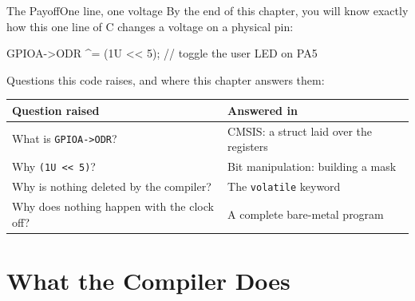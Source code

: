 \documentclass[9pt,aspectratio=169,xcolor=table]{beamer}
\newcommand{\shl}{\texttt{<{}<}}
\begin{document}
{\beamerextras
\begin{frame}[fragile]{The Payoff}{One line, one voltage}
    \leavevmode
    By the end of this chapter, you will know exactly how this one line of C changes a voltage on a physical pin:

    \vspace{2mm}
    \begin{center}
    \begin{minipage}{.9\textwidth}
\begin{cc}[basicstyle=\ttfamily\small]
GPIOA->ODR ^= (1U << 5);    // toggle the user LED on PA5
\end{cc}
    \end{minipage}
    \end{center}

    \vspace{2mm}
    {\small Questions this code raises, and where this chapter answers them:}

    \vspace{1mm}
    \begin{center}
    {\small
    \striped
    \begin{tabular}{@{}l R{.52\textwidth}@{}}
        \toprule
        \textbf{Question raised} & \textbf{Answered in} \\
        \midrule
        What is \texttt{GPIOA->ODR}? & CMSIS: a struct laid over the registers \\
        Why \texttt{(1U \shl\ 5)}? & Bit manipulation: building a mask \\
        Why is nothing deleted by the compiler? & The \texttt{volatile} keyword \\
        Why does nothing happen with the clock off? & A complete bare-metal program \\
        \bottomrule
    \end{tabular}}
    \end{center}
\end{frame}
}


\section{What the Compiler Does}
\end{document}
